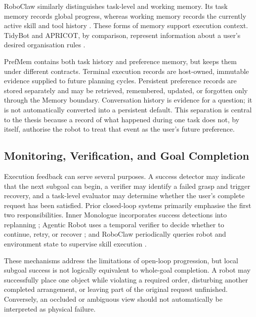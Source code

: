 \documentclass{article}
\begin{document}
RoboClaw similarly distinguishes task-level and working memory. Its task
memory records global progress, whereas working memory records the currently
active skill and tool history \parencite{li2026roboclaw}. These forms of memory
support execution context. TidyBot and APRICOT, by comparison, represent
information about a user's desired organisation rules
\parencite{wu2023tidybot,wang2024apricot}.

PrefMem contains both task history and preference memory, but keeps them under
different contracts. Terminal execution records are host-owned, immutable
evidence supplied to future planning cycles. Persistent preference records are
stored separately and may be retrieved, remembered, updated, or forgotten only
through the Memory boundary. Conversation history is evidence for a question;
it is not automatically converted into a persistent default. This separation
is central to the thesis because a record of what happened during one task
does not, by itself, authorise the robot to treat that event as the user's
future preference.

\subsection{Monitoring, Verification, and Goal Completion}
\label{subsec:related-verification}

Execution feedback can serve several purposes. A success detector may indicate
that the next subgoal can begin, a verifier may identify a failed grasp and
trigger recovery, and a task-level evaluator may determine whether the user's
complete request has been satisfied. Prior closed-loop systems primarily
emphasise the first two responsibilities. Inner Monologue incorporates success
detections into replanning \parencite{huang2022innermonologue}; Agentic Robot
uses a temporal verifier to decide whether to continue, retry, or recover
\parencite{yang2025agenticrobot}; and RoboClaw periodically queries robot and
environment state to supervise skill execution
\parencite{li2026roboclaw}.

These mechanisms address the limitations of open-loop progression, but local
subgoal success is not logically equivalent to whole-goal completion. A robot
may successfully place one object while violating a required order, disturbing
another completed arrangement, or leaving part of the original request
unfinished. Conversely, an occluded or ambiguous view should not automatically
be interpreted as physical failure.
\end{document}
